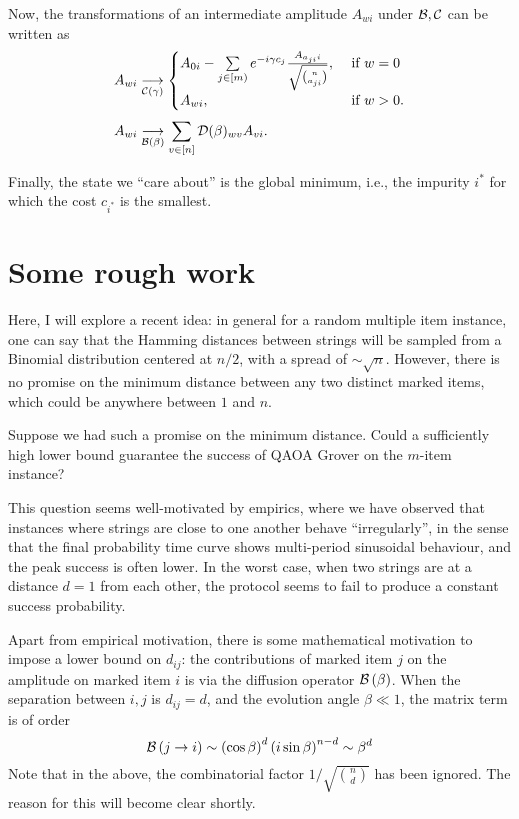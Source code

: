 \documentclass[11pt]{article}
\begin{document}
Now, the transformations of an intermediate amplitude $A_{wi}$ under $\mathcal{B},\mathcal{C}$ can be written as
\begin{align}
  \label{eq:imptransC}
  A_{wi} &\underset{\mathcal{C}\left(\gamma\right)}{\longrightarrow}
  \begin{cases}
    A_{0i} - \sum\limits_{j\in [m)}^{}e^{-i\gamma c_{j}}\frac{A_{a_{ji} i}}{\sqrt{\binom{n}{a_{ji}}}}, &\text{ if } w=0\\
    A_{wi}, &\text{ if } w>0.
  \end{cases}\\
  \label{eq:imptransB}
  A_{wi} &\underset{\mathcal{B}\left(\beta\right)}{\longrightarrow} \sum\limits_{v\in [n]}^{}\mathcal{D}(\beta)_{wv}A_{v i}.
\end{align}

Finally, the state we ``care about'' is the global minimum, i.e., the impurity $i^*$ for which the cost $c_{i^*}$ is the smallest. 

\section{Some rough work}

Here, I will explore a recent idea: in general for a random multiple item instance, one can say that the Hamming distances between strings will be sampled from a Binomial distribution centered at $n/2$, with a spread of $\sim \sqrt{n}$. However, there is no promise on the minimum distance between any two distinct marked items, which could be anywhere between $1$ and $n$.

Suppose we had such a promise on the minimum distance. Could a sufficiently high lower bound guarantee the success of QAOA Grover on the $m$-item instance?

This question seems well-motivated by empirics, where we have observed that instances where strings are close to one another behave ``irregularly'', in the sense that the final probability time curve shows multi-period sinusoidal behaviour, and the peak success is often lower. In the worst case, when two strings are at a distance $d=1$ from each other, the protocol seems to fail to produce a constant success probability.

Apart from empirical motivation, there is some mathematical motivation to impose a lower bound on $d_{ij}$: the contributions of marked item $j$ on the amplitude on marked item $i$ is via the diffusion operator $\mathcal{B\left(\beta\right)}$. When the separation between $i,j$ is $d_{ij} = d$, and the evolution angle $\beta \ll 1$, the matrix term is of order
\begin{equation}
  \mathcal{B}\left(j\rightarrow i\right) \sim \left(\cos\beta\right)^d \left(i\sin\beta\right)^{n-d} \sim \beta^{d}
\end{equation}
Note that in the above, the combinatorial factor $1/\sqrt{\binom n d}$ has been ignored. The reason for this will become clear shortly.
\end{document}
